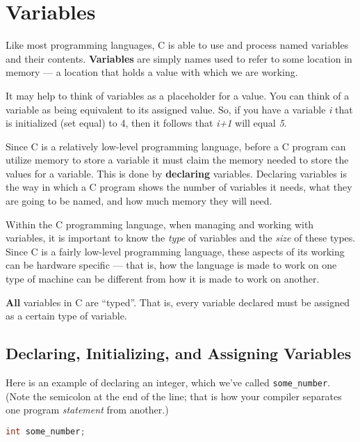 \section{Variables}
Like most programming languages, C is able to use and process named variables
and their contents. \textbf{Variables} are simply names used to refer to some
location in memory --- a location that holds a value with which we are working. 

It may help to think of variables as a placeholder for a value. You can think
of a variable as being equivalent to its assigned value. So, if you have a
variable \emph{i} that is initialized (set equal) to 4, then it follows that
\emph{i+1} will equal \emph{5}.

Since C is a relatively low-level programming language, before a C program can
utilize memory to store a variable it must claim the memory needed to store the
values for a variable. This is done by \textbf{declaring} variables. Declaring
variables is the way in which a C program shows the number of variables it
needs, what they are going to be named, and how much memory they will need.

Within the C programming language, when managing and working with variables, it
is important to know the \emph{type} of variables and the \emph{size} of these
types. Since C is a fairly low-level programming language, these aspects of its
working can be hardware specific --- that is, how the language is made to work
on one type of machine can be different from how it is made to work on another.

\textbf{All} variables in C are ``typed''. That is, every variable declared
must be assigned as a certain type of variable.

\subsection{Declaring, Initializing, and Assigning Variables}
Here is an example of declaring an integer, which we've called
\texttt{some\_number}. (Note the semicolon at the end of the line; that is how
your compiler separates one program \emph{statement} from another.)
\lstset{basicstyle=\scriptsize, numbers=left, captionpos=b, tabsize=4}
\begin{lstlisting}[caption=Section \thesection listing \arabic{varcnt},language={C},
breaklines=true,xleftmargin=15pt,label=lst:section\thesection listing\arabic{varcnt}]
int some_number;
\end{lstlisting}

